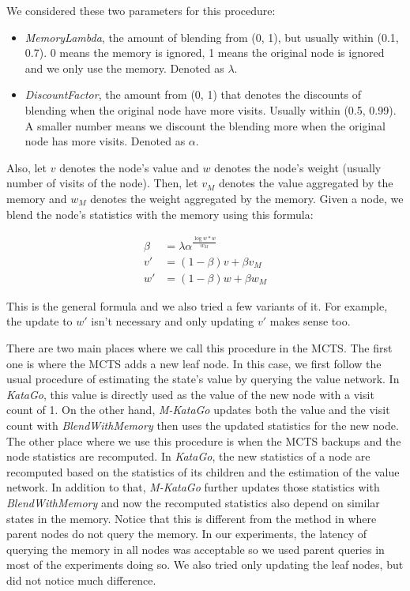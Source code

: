 \documentclass{article}
\newcommand{\katago}{\emph{KataGo}\xspace}
\newcommand{\mkatago}{\emph{M-KataGo}\xspace}
\begin{document}
      We considered these two parameters for this procedure:
      \begin{itemize}
            \item \textit{MemoryLambda}, the amount of blending from (0, 1), but usually within (0.1, 0.7).
                  0 means the memory is ignored, 1 means the original node is ignored and we only use the memory.
                  Denoted as $\lambda$.
            \item \textit{DiscountFactor}, the amount from (0, 1) that denotes the discounts of blending when the original node have more visits.
                  Usually within (0.5, 0.99).
                  A smaller number means we discount the blending more when the original node has more visits.
                  Denoted as $\alpha$.
      \end{itemize}

      Also, let $v$ denotes the node's value and $w$ denotes the node's weight (usually number of visits of the node).
      Then, let $v_M$ denotes the value aggregated by the memory and $w_M$ denotes the weight aggregated by the memory.
      Given a node, we blend the node's statistics with the memory using this formula:

      \begin{align*}
            \beta &= \lambda \alpha^{\frac{\log{w} * w}{w_M}} \\
            v'    &= (1 - \beta) v + \beta v_M \\
            w'    &= (1 - \beta) w + \beta w_M
      \end{align*}

      This is the general formula and we also tried a few variants of it.
      For example, the update to $w'$ isn't necessary and only updating $v'$ makes sense too.

      There are two main places where we call this procedure in the MCTS.
      The first one is where the MCTS adds a new leaf node.
      In this case, we first follow the usual procedure of estimating the state's value by querying the value network.
      In \katago, this value is directly used as the value of the new node with a visit count of 1.
      On the other hand, \mkatago updates both the value and the visit count with \textit{BlendWithMemory} then uses the updated statistics for the new node.
      The other place where we use this procedure is when the MCTS backups and the node statistics are recomputed. 
      In \katago, the new statistics of a node are recomputed based on the statistics of its children and the estimation of the value network.
      In addition to that, \mkatago further updates those statistics with \textit{BlendWithMemory} and now the recomputed statistics also depend on similar states in the memory.
      Notice that this is different from the method in \cite{xiao_memory-augmented_2018} where parent nodes do not query the memory.
      In our experiments, the latency of querying the memory in all nodes was acceptable so we used parent queries in most of the experiments doing so.
      We also tried only updating the leaf nodes, but did not notice much difference.
\end{document}
